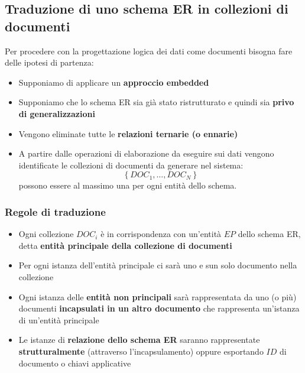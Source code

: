 \documentclass[a4paper,twoside]{article}
\begin{document}
\subsection{Traduzione di uno schema ER in collezioni di documenti}
Per procedere con la progettazione logica dei dati come documenti bisogna fare delle
ipotesi di partenza:
\begin{itemize}
  \item Supponiamo di applicare un \textbf{approccio embedded}
  \item Supponiamo che lo schema ER sia già stato ristrutturato e quindi sia
    \textbf{privo di generalizzazioni}
  \item Vengono eliminate tutte le \textbf{relazioni ternarie (o ennarie)}
  \item A partire dalle operazioni di elaborazione da eseguire sui dati vengono identificate
    le collezioni di documenti da generare nel sistema:
    \[
      \left\{ DOC_1, \ldots, DOC_N \right\}
    \] 
    possono essere al massimo una per ogni entità dello schema.
\end{itemize}

\subsubsection{Regole di traduzione}
\begin{itemize}
  \item Ogni collezione \( DOC_i \) è in corrispondenza con un'entità \( EP \) dello
    schema ER, detta \textbf{entità principale della collezione di documenti}

  \item Per ogni istanza dell'entità principale ci sarà uno e sun solo documento
    nella collezione

  \item Ogni istanza delle \textbf{entità non principali} sarà rappresentata da uno
    (o più) documenti \textbf{incapsulati in un altro documento} che rappresenta
    un'istanza di un'entità principale

  \item Le istanze di \textbf{relazione dello schema ER} saranno rappresentate
    \textbf{strutturalmente} (attraverso l'incapsulamento) oppure esportando \( ID \) 
    di documento o chiavi applicative
\end{itemize}
\end{document}
